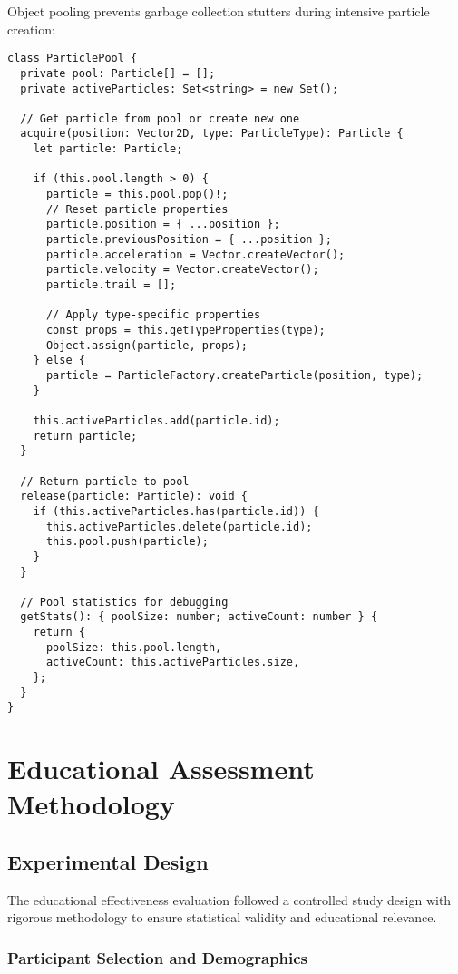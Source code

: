 \documentclass[12pt,journal,onecolumn]{IEEEtran}
\begin{document}
Object pooling prevents garbage collection stutters during intensive particle creation:

\begin{verbatim}
class ParticlePool {
  private pool: Particle[] = [];
  private activeParticles: Set<string> = new Set();

  // Get particle from pool or create new one
  acquire(position: Vector2D, type: ParticleType): Particle {
    let particle: Particle;
    
    if (this.pool.length > 0) {
      particle = this.pool.pop()!;
      // Reset particle properties
      particle.position = { ...position };
      particle.previousPosition = { ...position };
      particle.acceleration = Vector.createVector();
      particle.velocity = Vector.createVector();
      particle.trail = [];
      
      // Apply type-specific properties
      const props = this.getTypeProperties(type);
      Object.assign(particle, props);
    } else {
      particle = ParticleFactory.createParticle(position, type);
    }
    
    this.activeParticles.add(particle.id);
    return particle;
  }

  // Return particle to pool
  release(particle: Particle): void {
    if (this.activeParticles.has(particle.id)) {
      this.activeParticles.delete(particle.id);
      this.pool.push(particle);
    }
  }

  // Pool statistics for debugging
  getStats(): { poolSize: number; activeCount: number } {
    return {
      poolSize: this.pool.length,
      activeCount: this.activeParticles.size,
    };
  }
}
\end{verbatim}

\section{Educational Assessment Methodology}
\label{app:assessment}

\subsection{Experimental Design}

The educational effectiveness evaluation followed a controlled study design with rigorous methodology to ensure statistical validity and educational relevance.

\subsubsection{Participant Selection and Demographics}
\end{document}
